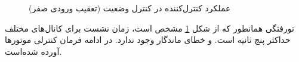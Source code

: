 \begin{figure}[H]
	\centering
	\caption{‫‪عملکرد کنترل‌کننده  در کنترل وضعیت (تعقیب ورودی صفر)}
	\label{lqidg_roll_pitch_yaw_fig_simulation_ll}
\end{figure}
‌تورفتگی همانطور که از شکل
\ref{lqidg_roll_pitch_yaw_fig_simulation_ll}
مشخص است، زمان نشست برای کانال‌های مختلف حداکثر پنج ثانیه است. و خطای ماندگار وجود ندارد. در ادامه فرمان کنترلی موتورها آورده شده‌است.


